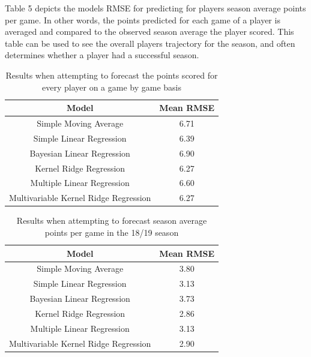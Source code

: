 \documentclass[a4paper,11pt,twoside]{article}
\begin{document}
Table 5 depicts the models RMSE for predicting for players season average points per game. In other words, the points predicted for each game of a player is averaged and compared to the observed season average the player scored. This table can be used to see the overall players trajectory for the season, and often determines whether a player had a successful season.
\vspace{5mm}
\begin{table} [h!]
\captionsetup{justification=centering}
\begin{center}
\begin{tabular}{ |c|c|} 
 \hline
 \textbf{Model} & \textbf{Mean RMSE}\\ 
 \hline
 Simple Moving Average &  6.71\\ 
 \hline
 Simple Linear Regression &  6.39\\ 
 \hline
 Bayesian Linear Regression& 6.90\\
 \hline
 Kernel Ridge Regression& 6.27\\
 \hline
 Multiple Linear Regression& 6.60\\
 \hline
 Multivariable Kernel Ridge Regression & 6.27\\
 \hline
\end{tabular}
\end{center}
\caption{Results when attempting to forecast the points scored for every player on a game by game basis}
\end{table}

\begin{table}[h!]
\captionsetup{justification=centering}
\begin{center}
\begin{tabular}{ |c|c|} 
 \hline
     \textbf{Model} & \textbf{Mean RMSE}\\ 
 \hline
 Simple Moving Average  & 3.80\\ 
 \hline
 Simple Linear Regression & 3.13\\ 
 \hline
 Bayesian Linear Regression  & 3.73 \\
 \hline
 Kernel Ridge Regression  & 2.86\\
 \hline
 Multiple Linear Regression& 3.13\\
 \hline
 Multivariable Kernel Ridge Regression  & 2.90\\
 \hline
\end{tabular}
\end{center}
\caption{Results when attempting to forecast season average points per game in the 18/19 season}
\end{table}
\end{document}
